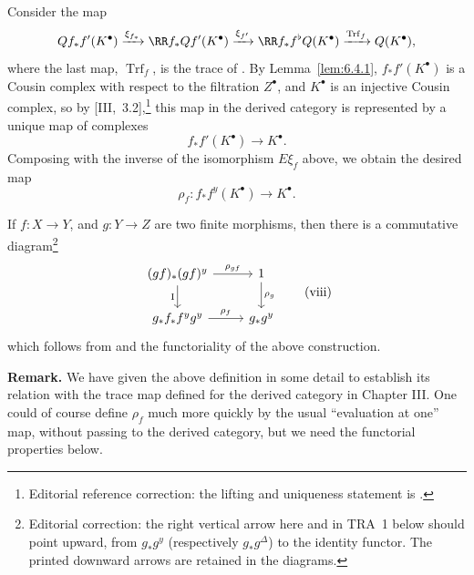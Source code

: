 Consider the map
\[
Qf_{*}f'(K^{\bullet}) \xrightarrow{\xi_{f_{*}}} \RR f_{*}Qf'(K^{\bullet}) \xrightarrow{\xi_{f'}} \RR f_{*}f^{\flat}Q(K^{\bullet}) \xrightarrow{\operatorname{Trf}_{f}} Q(K^{\bullet}),
\]
where the last map, $\operatorname{Trf}_f$, is the trace of . By Lemma~\ref{lem:6.4.1}, $f_*f'(K^\bullet)$ is a Cousin complex with respect to the filtration $Z^\bullet$, and $K^\bullet$ is an injective Cousin complex, so by [III,~3.2],\footnote{Editorial reference correction: the lifting and uniqueness statement is .} this map in the derived category is represented by a unique map of complexes
\[
f_*f'(K^\bullet) \longrightarrow K^\bullet.
\]
Composing with the inverse of the isomorphism $E\xi_f$ above, we obtain the desired map
\[
\rho_{f}\colon f_{*}f^{y}(K^{\bullet}) \longrightarrow K^{\bullet}.
\]

If $f\colon X\to Y$, and $g\colon Y\to Z$ are two finite morphisms, then there is a commutative diagram\footnote{Editorial correction: the right vertical arrow here and in TRA~1 below should point upward, from $g_*g^y$ (respectively $g_*g^\Delta$) to the identity functor. The printed downward arrows are retained in the diagrams.}
\[
\begin{tikzcd}
(gf)_*(gf)^{y} \ar[r,"\rho_{gf}"] \ar[d,"\mathrm{I}"'] & 1 \ar[d,"\rho_g"] \\
g_*f_* f^{y}g^{y} \ar[r,"\rho_f"] & g_*g^{y}
\end{tikzcd}
\tag{viii}\label{eq:6.4.viii}
\]
which follows from  and the functoriality of the above construction.

\par\medskip\noindent\textbf{Remark.}
We have given the above definition in some detail to establish its relation with the trace map defined for the derived category in Chapter III. One could of course define $\rho_f$ much more quickly by the usual ``evaluation at one'' map, without passing to the derived category, but we need the functorial properties below.
\par\medskip

